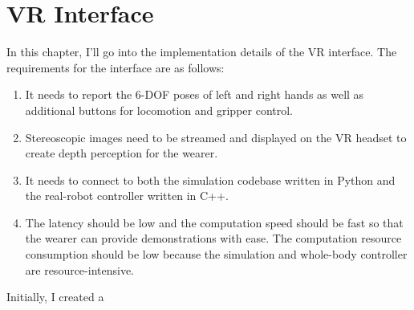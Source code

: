 \chapter{VR Interface}

In this chapter, I'll go into the implementation details of the VR interface. 
The requirements for the interface are as follows:
\begin{enumerate}
    \item It needs to report the 6-DOF poses of left and right hands as well as additional buttons for locomotion and gripper control. 
    \item Stereoscopic images need to be streamed and displayed on the VR headset to create depth perception for the wearer. 
    \item It needs to connect to both the simulation codebase written in Python and the real-robot controller written in C++. 
    \item The latency should be low and the computation speed should be fast so that the wearer can provide demonstrations with ease. The computation resource consumption should be low because the simulation and whole-body controller are resource-intensive.
\end{enumerate}

Initially, I created a 
